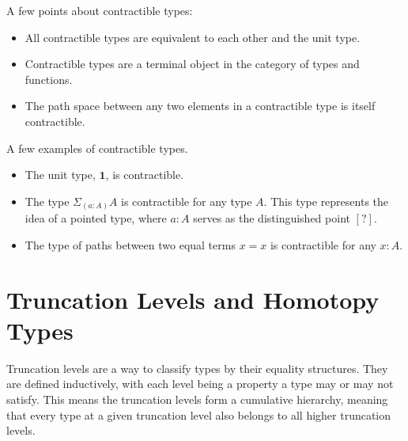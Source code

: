 \documentclass{article}
\begin{document}
\begin{remark}[Properties]
  A few points about contractible types:
  \begin{itemize}
    \item All contractible types are equivalent to each other and the unit type.

    \item Contractible types are a terminal object in the category of types and functions.

    \item The path space between any two elements in a contractible type is itself contractible.
  \end{itemize}
\end{remark}
\begin{remark}[Examples]
   A few examples of contractible types.
  \begin{itemize}
    \item The unit type, $\mathbf{1}$, is contractible.

    \item The type $\Sigma_{(a : A)} A$ is contractible for any type $A$. This type represents the idea of a pointed type, where $a : A$ serves as the distinguished point $\mathbf{[?]}$.

    \item The type of paths between two equal terms $x = x$ is contractible for any $x : A$.

  \end{itemize}
\end{remark}

\section{Truncation Levels and Homotopy Types}

\begin{remark}
  Truncation levels are a way to classify types by their equality structures. They are defined inductively, with each level being a property a type may or may not satisfy. This means the truncation levels form a cumulative hierarchy, meaning that every type at a given truncation level also belongs to all higher truncation levels.
\end{remark}
\end{document}
